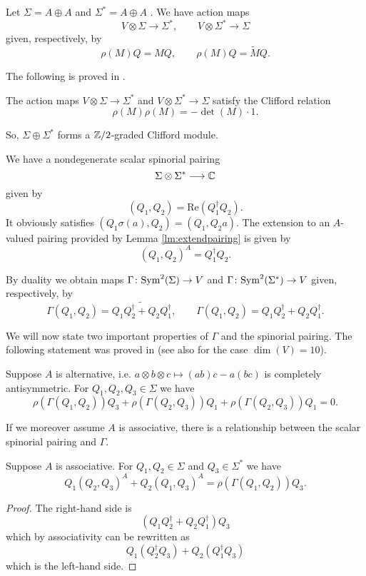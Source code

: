 \documentclass[10pt, oneside]{article}
\renewcommand{\Re}{\mathrm{Re}}
\begin{document}
Let $\Sigma=A\oplus A$ and $\Sigma^* = A\oplus A$ . We have action maps
\[V\otimes \Sigma\rightarrow \Sigma^*,\qquad V\otimes \Sigma^*\rightarrow \Sigma\]
given, respectively, by
\[\rho(M)Q = M Q,\qquad \rho(M)Q = \widetilde{M} Q.\]

The following is proved in \cite[Proposition 6]{BaezHuerta}.

\begin{prop}
The action maps $V\otimes \Sigma\rightarrow \Sigma^*$ and $V\otimes \Sigma^*\rightarrow \Sigma$ satisfy the Clifford relation
\[\rho(M)\rho(M) = -\det(M)\cdot 1.\]
\end{prop}

So, $\Sigma\oplus \Sigma^*$ forms a $\mathbb Z/2$-graded Clifford module.

We have a nondegenerate scalar spinorial pairing
\[\Sigma\otimes \Sigma^*\longrightarrow \mathbb C\]
given by
\[(Q_1, Q_2) = \Re(Q_1^\dagger Q_2).\]
It obviously satisfies $(Q_1 \sigma(a), Q_2) = (Q_1, Q_2 a)$. The extension to an $A$-valued pairing provided by Lemma \ref{lm:extendpairing} is given by
\[(Q_1, Q_2)^A = Q_1^\dagger Q_2.\]

By duality we obtain maps $\Gamma\colon{\rm Sym}^2(\Sigma)\rightarrow V$ and $\Gamma\colon {\rm Sym}^2(\Sigma^*)\rightarrow V$ given, respectively, by
\[\Gamma(Q_1, Q_2) = \widetilde{Q_1Q_2^\dagger + Q_2Q_1^\dagger},\qquad \Gamma(Q_1, Q_2) = Q_1Q_2^\dagger + Q_2Q_1^\dagger.\]

We will now state two important properties of $\Gamma$ and the spinorial pairing. The following statement was proved in \cite[Theorem 11]{BaezHuerta} (see also \cite{Schray} for the case $\dim(V)=10$).

\begin{thm}
Suppose $A$ is alternative, i.e. $a\otimes b\otimes c\mapsto (ab)c - a(bc)$ is completely antisymmetric. For $Q_1, Q_2, Q_3\in\Sigma$ we have
\[\rho(\Gamma(Q_1, Q_2))Q_3 + \rho(\Gamma(Q_2, Q_3))Q_1 + \rho(\Gamma(Q_2, Q_3))Q_1 = 0.\]
\label{thm:3psi}
\end{thm}

If we moreover assume $A$ is associative, there is a relationship between the scalar spinorial pairing and $\Gamma$.

\begin{thm}
Suppose $A$ is associative. For $Q_1, Q_2\in\Sigma$ and $Q_3\in\Sigma^*$ we have
\[Q_1(Q_2, Q_3)^A + Q_2(Q_1, Q_3)^A = \rho(\Gamma(Q_1, Q_2)) Q_3.\]
\label{thm:matter3psi}
\end{thm}
\begin{proof}
The right-hand side is
\[(Q_1Q_2^\dagger + Q_2Q_1^\dagger)Q_3\]
which by associativity can be rewritten as
\[Q_1(Q_2^\dagger Q_3) + Q_2(Q_1^\dagger Q_3)\]
which is the left-hand side.
\end{proof}
\end{document}
